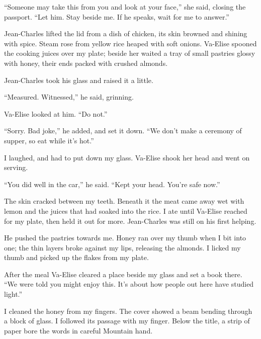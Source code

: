 ``Someone may take this from you and look at your face,'' she said, closing the passport. ``Let him. Stay beside me. If he speaks, wait for me to answer.''\par

Jean-Charles lifted the lid from a dish of chicken, its skin browned and shining with spice. Steam rose from yellow rice heaped with soft onions. Va-Elise spooned the cooking juices over my plate; beside her waited a tray of small pastries glossy with honey, their ends packed with crushed almonds.\par

Jean-Charles took his glass and raised it a little.\par

``Measured. Witnessed,'' he said, grinning.\par

Va-Elise looked at him. ``Do not.''\par

``Sorry. Bad joke,'' he added, and set it down. ``We don't make a ceremony of supper, so eat while it's hot.''\par

I laughed, and had to put down my glass. Va-Elise shook her head and went on serving.\par

``You did well in the car,'' he said. ``Kept your head. You're safe now.''\par

The skin cracked between my teeth. Beneath it the meat came away wet with lemon and the juices that had soaked into the rice. I ate until Va-Elise reached for my plate, then held it out for more. Jean-Charles was still on his first helping.\par

He pushed the pastries towards me. Honey ran over my thumb when I bit into one; the thin layers broke against my lips, releasing the almonds. I licked my thumb and picked up the flakes from my plate.\par

After the meal Va-Elise cleared a place beside my glass and set a book there. ``We were told you might enjoy this. It's about how people out here have studied light.''\par

I cleaned the honey from my fingers. The cover showed a beam bending through a block of glass. I followed its passage with my finger. Below the title, a strip of paper bore the words in careful Mountain hand.\par

